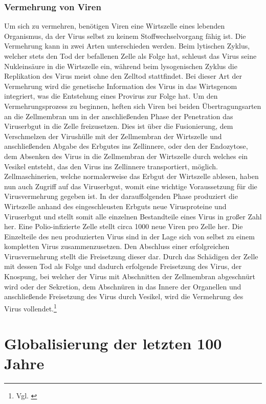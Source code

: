 \documentclass[12pt]{article}
\newcommand{\nocontentsline}[3]{}
\newcommand{\tocless}[2]{\bgroup\let\addcontentsline=\nocontentsline#1{#2}\egroup}
\begin{document}
\tocless \subsubsection{Vermehrung von Viren}
Um sich zu vermehren, benötigen Viren eine Wirtszelle eines lebenden Organismus, da der Virus selbst zu keinem Stoffwechselvorgang fähig ist. Die Vermehrung kann in zwei Arten unterschieden werden. Beim lytischen Zyklus, welcher stets den Tod der befallenen Zelle als Folge hat, schleust das Virus seine Nukleinsäure in die Wirtszelle ein, während beim lysogenischen Zyklus die Replikation des Virus meist ohne den Zelltod stattfindet. Bei dieser Art der Vermehrung wird die genetische Information des Virus in das Wirtsgenom integriert, was die Entstehung eines Provirus zur Folge hat. Um den Vermehrungsprozess zu beginnen, heften sich Viren bei beiden Übertragungsarten an die Zellmembran um in der anschließenden Phase der Penetration das Viruserbgut in die Zelle freizusetzen. Dies ist über die Fusionierung, dem Verschmelzen der Virushülle mit der Zellmembran der Wirtszelle und anschließenden Abgabe des Erbgutes ins Zellinnere, oder den der Endozytose, dem Absenken des Virus in die Zellmembran der Wirtszelle durch welches ein Vesikel entsteht, das den Virus ins Zellinnere transportiert, möglich. Zellmaschinerien, welche normalerweise das Erbgut der Wirtszelle ablesen, haben nun auch Zugriff auf das Viruserbgut, womit eine wichtige Voraussetzung für die Virusvermehrung gegeben ist. In der darauffolgenden Phase produziert die Wirtszelle anhand des eingeschleusten Erbguts neue Virusproteine und Viruserbgut und stellt somit alle einzelnen Bestandteile eines Virus in großer Zahl her. Eine Polio-infizierte Zelle stellt circa 1000 neue Viren pro Zelle her. Die Einzelteile des neu produzierten Virus sind in der Lage sich von selbst zu einem kompletten Virus zusammenzusetzen. Den Abschluss einer erfolgreichen Virusvermehrung stellt die Freisetzung dieser dar. Durch das Schädigen der Zelle mit dessen Tod als Folge und dadurch erfolgende Freisetzung des Virus, der Knospung, bei welcher der Virus mit Abschnitten der Zellmembran abgeschnürt wird oder der Sekretion, dem Abschnüren in das Innere der Organellen und anschließende Freisetzung des Virus durch Vesikel, wird die Vermehrung des Virus vollendet.\footnote{Vgl. \cite{vermehr22}}

\section{Globalisierung der letzten 100 Jahre}\label{sec:Globalisierung}
\end{document}
